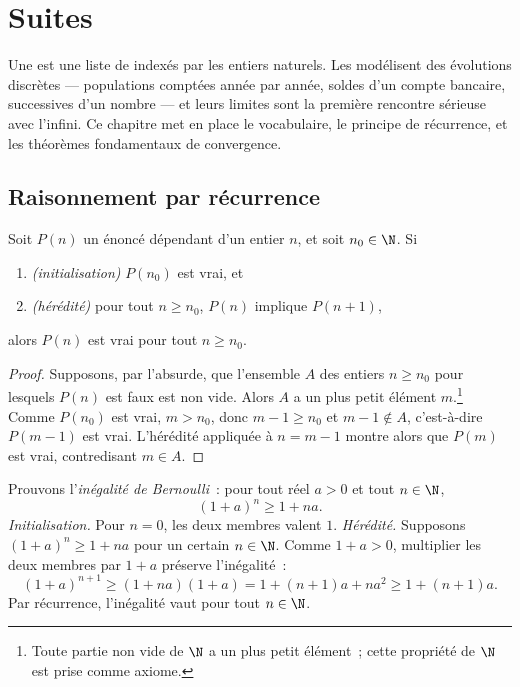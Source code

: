 \chapter{Suites}\label{ch:g12:seq}

Une  est une liste de  indexés par les entiers naturels.
Les  modélisent des évolutions discrètes --- populations comptées
année par année, soldes d'un compte bancaire,  successives
d'un nombre --- et leurs limites sont la première rencontre sérieuse avec
l'infini. Ce chapitre met en place le vocabulaire, le principe de
récurrence, et les théorèmes fondamentaux de convergence.

\section{Raisonnement par récurrence}

\begin{theorem}\label{thm:g12:seq:induction}
Soit $P(n)$ un énoncé dépendant d'un entier $n$, et soit $n_0 \in \N$. Si
\begin{enumerate}
  \item \emph{(initialisation)} $P(n_0)$ est vrai, et
  \item \emph{(hérédité)} pour tout $n \geq n_0$, $P(n)$ implique $P(n+1)$,
\end{enumerate}
alors $P(n)$ est vrai pour tout $n \geq n_0$.
\end{theorem}

\begin{proof}
Supposons, par l'absurde, que l'ensemble $A$ des entiers $n \geq n_0$ pour
lesquels $P(n)$ est faux est non vide. Alors $A$ a un plus petit élément
$m$.\footnote{Toute partie non vide de $\N$ a un plus petit élément~; cette
propriété de $\N$ est prise comme axiome.} Comme $P(n_0)$ est vrai,
$m > n_0$, donc $m - 1 \geq n_0$ et $m-1 \notin A$, c'est-à-dire $P(m-1)$
est vrai. L'hérédité appliquée à $n = m-1$ montre alors que $P(m)$ est
vrai, contredisant $m \in A$.
\end{proof}

\begin{example}\label{ex:g12:seq:bernoulli}
Prouvons l'\emph{inégalité de Bernoulli}~: pour tout réel $a > 0$ et tout
$n \in \N$,
\[
(1+a)^n \geq 1 + na.
\]
\emph{Initialisation.} Pour $n = 0$, les deux membres valent $1$.
\emph{Hérédité.} Supposons $(1+a)^n \geq 1+na$ pour un certain $n \in \N$.
Comme $1 + a > 0$, multiplier les deux membres par $1+a$ préserve
l'inégalité~:
\[
(1+a)^{n+1} \geq (1+na)(1+a) = 1 + (n+1)a + na^2 \geq 1 + (n+1)a .
\]
Par récurrence, l'inégalité vaut pour tout $n \in \N$.
\end{example}

